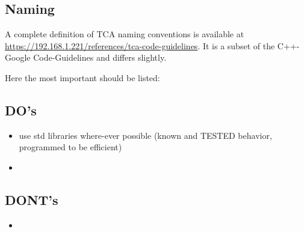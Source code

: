 \subsection{Naming}
A complete definition of TCA naming conventions is available at \url{https://192.168.1.221/references/tca-code-guidelines}. It is a subset of the C++-Google Code-Guidelines and differs slightly.

Here the most important should be listed:

\subsection{DO's}
\begin{itemize}
	\item use std libraries where-ever possible (known and TESTED behavior, programmed to be efficient)
	\item 
\end{itemize}

\subsection{DONT's}

\begin{itemize}
	\item 
\end{itemize}